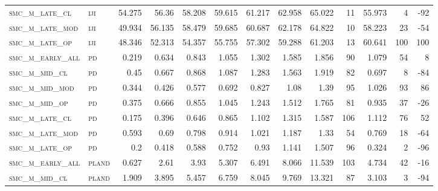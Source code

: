 \begin{landscape}
\begin{center}
\begin{footnotesize}
\begin{longtable}{llrrrrrrrr|rrr}
\textsc{smc\_m\_late\_cl  } & \textsc{iji       }   & 54.275   & 56.36    & 58.208   & 59.615   & 61.217   & 62.958   & 65.022   & 11     & 55.973        & 4             & -92             \\
\textsc{smc\_m\_late\_mod } & \textsc{iji       }   & 49.934   & 56.135   & 58.479   & 59.685   & 60.687   & 62.178   & 64.822   & 10     & 58.223        & 23            & -54             \\
\textsc{smc\_m\_late\_op  } & \textsc{iji       }   & 48.346   & 52.313   & 54.357   & 55.755   & 57.302   & 59.288   & 61.203   & 13     & 60.641        & 100           & 100             \\
\textsc{smc\_m\_early\_all} & \textsc{pd        }   & 0.219    & 0.634    & 0.843    & 1.055    & 1.302    & 1.585    & 1.856    & 90     & 1.079         & 54            & 8               \\
\textsc{smc\_m\_mid\_cl   } & \textsc{pd        }   & 0.45     & 0.667    & 0.868    & 1.087    & 1.283    & 1.563    & 1.919    & 82     & 0.697         & 8             & -84             \\
\textsc{smc\_m\_mid\_mod  } & \textsc{pd        }   & 0.344    & 0.426    & 0.577    & 0.692    & 0.827    & 1.08     & 1.39     & 95     & 1.026         & 93            & 86              \\
\textsc{smc\_m\_mid\_op   } & \textsc{pd        }   & 0.375    & 0.666    & 0.855    & 1.045    & 1.243    & 1.512    & 1.765    & 81     & 0.935         & 37            & -26             \\
\textsc{smc\_m\_late\_cl  } & \textsc{pd        }   & 0.175    & 0.396    & 0.646    & 0.865    & 1.102    & 1.315    & 1.587    & 106    & 1.112         & 76            & 52              \\
\textsc{smc\_m\_late\_mod } & \textsc{pd        }   & 0.593    & 0.69     & 0.798    & 0.914    & 1.021    & 1.187    & 1.33     & 54     & 0.769         & 18            & -64             \\
\textsc{smc\_m\_late\_op  } & \textsc{pd        }   & 0.2      & 0.418    & 0.588    & 0.752    & 0.93     & 1.141    & 1.507    & 96     & 0.324         & 2             & -96             \\
\textsc{smc\_m\_early\_all} & \textsc{pland     }   & 0.627    & 2.61     & 3.93     & 5.307    & 6.491    & 8.066    & 11.539   & 103    & 4.734         & 42            & -16             \\
\textsc{smc\_m\_mid\_cl   } & \textsc{pland     }   & 1.909    & 3.895    & 5.457    & 6.759    & 8.045    & 9.769    & 13.321   & 87     & 3.103         & 3             & -94             \\

\end{longtable}
\end{footnotesize}
\end{center}
\end{landscape}
